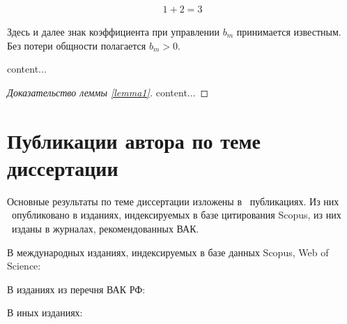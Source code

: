 \begin{align} %
	1+2=3
\end{align}

\begin{assumption-syn-ru}
	Здесь и далее знак коэффициента при управлении $b_m$
	принимается известным. Без потери общности полагается $b_m >0$.
\end{assumption-syn-ru}
\begin{lemma-syn-ru} \label{lemma1}
	content...
\end{lemma-syn-ru}

\begin{proof}[Доказательство леммы \ref{lemma1}]
	content...
\end{proof}

\section*{Публикации автора по теме диссертации}

Основные результаты по теме диссертации изложены в \theAllMyPapers~публикациях. 
Из них \theScopusPapers~опубликовано в изданиях, индексируемых в базе цитирования Scopus, 
из них \theVakPapers~изданы в журналах, рекомендованных ВАК. 
%

В международных изданиях, индексируемых в базе данных Scopus, Web of Science:
\printPapperScopus

В изданиях из перечня ВАК РФ:

В иных изданиях:
\printPapperOther
